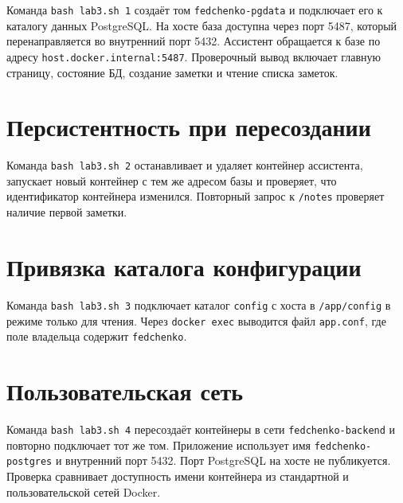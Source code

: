 Команда \texttt{bash lab3.sh 1} создаёт том \texttt{fedchenko-pgdata} и
подключает его к каталогу данных PostgreSQL. На хосте база доступна через
порт 5487, который перенаправляется во внутренний порт 5432. Ассистент
обращается к базе по адресу \texttt{host.docker.internal:5487}. Проверочный
вывод включает главную страницу, состояние БД, создание заметки и чтение
списка заметок.

\clearpage

\section{Персистентность при пересоздании}

Команда \texttt{bash lab3.sh 2} останавливает и удаляет контейнер ассистента,
запускает новый контейнер с тем же адресом базы и проверяет, что
идентификатор контейнера изменился. Повторный запрос к \texttt{/notes}
проверяет наличие первой заметки.

\clearpage

\section{Привязка каталога конфигурации}

Команда \texttt{bash lab3.sh 3} подключает каталог \texttt{config} с хоста
в \texttt{/app/config} в режиме только для чтения. Через \texttt{docker exec}
выводится файл \texttt{app.conf}, где поле владельца содержит
\texttt{fedchenko}.

\clearpage

\section{Пользовательская сеть}

Команда \texttt{bash lab3.sh 4} пересоздаёт контейнеры в сети
\texttt{fedchenko-backend} и повторно подключает тот же том. Приложение
использует имя \texttt{fedchenko-postgres} и внутренний порт 5432.
Порт PostgreSQL на хосте не публикуется. Проверка сравнивает доступность
имени контейнера из стандартной и пользовательской сетей Docker.

\clearpage

